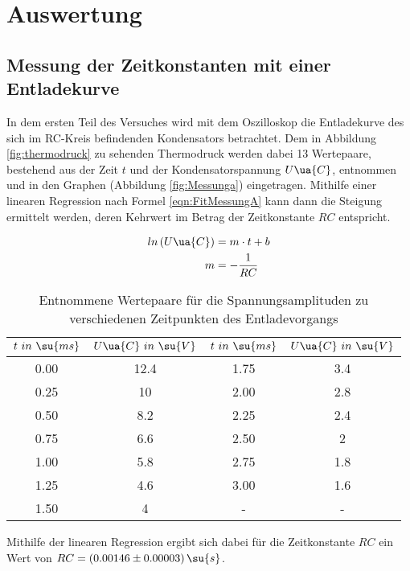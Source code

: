 \section{Auswertung}

\subsection{Messung der Zeitkonstanten mit einer Entladekurve}

In dem ersten Teil des Versuches wird mit dem Oszilloskop die Entladekurve des
sich im RC-Kreis befindenden Kondensators betrachtet. Dem in Abbildung \ref{fig:thermodruck}
zu sehenden Thermodruck werden dabei 13 Wertepaare, bestehend aus der Zeit $t$
und der Kondensatorspannung $U\ua{C}$, entnommen und in den Graphen
(Abbildung \ref{fig:Messunga}) eingetragen. Mithilfe einer linearen Regression nach
Formel \eqref{eqn:FitMessungA} kann dann die Steigung ermittelt werden, deren
Kehrwert im Betrag der Zeitkonstante $RC$ entspricht.

\begin{align}
  \label{eqn:FitMessungA}
  ln \left( U\ua{C} \right) &= m \cdot t + b \\
  m    &= -\frac{1}{RC}
\end{align}

\begin{table}
  \centering
  \caption{Entnommene Wertepaare für die Spannungsamplituden zu verschiedenen
          Zeitpunkten des Entladevorgangs}
  \label{tab:MessungA}
  \begin{tabular}{c c || c c}
    \toprule $t \,\, in \,\, \su{ms}$ & $U\ua{C} \,\, in \,\, \su{V}$ &
             $t \,\, in \,\, \su{ms}$ & $U\ua{C} \,\, in \,\, \su{V}$ \\
    \midrule
    0.00 & 12.4 & 1.75 & 3.4 \\
    0.25 & 10   & 2.00 & 2.8 \\
    0.50 &  8.2 & 2.25 & 2.4 \\
    0.75 &  6.6 & 2.50 & 2   \\
    1.00 &  5.8 & 2.75 & 1.8 \\
    1.25 &  4.6 & 3.00 & 1.6 \\
    1.50 &  4   & -    & -   \\
    \bottomrule
  \end{tabular}
\end{table}

Mithilfe der linearen Regression ergibt sich dabei für die Zeitkonstante $RC$ ein
Wert von $RC = (0.00146 \pm 0.00003) \, \su{s}$.

